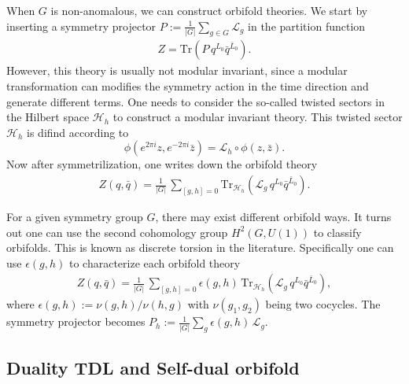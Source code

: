 \documentclass[submission, PhysLectNotes]{SciPost}
\begin{document}
When $G$ is non-anomalous, we can construct orbifold theories. We start by inserting a symmetry projector $P := \frac{1}{|G|} \sum_{g \in G} \mathcal{L}_g$ in the partition function 
\begin{equation}
	\begin{aligned}
		Z = \mathrm{Tr}\left( P\,q^{L_0} \bar{q}^{\bar{L}_0} \right).
	\end{aligned}
\end{equation}
However, this theory is usually not modular invariant, since a modular transformation can modifies the symmetry action in the time direction and generate different terms. One needs to consider the so-called twisted sectors in the Hilbert space $\mathcal{H}_h$ to construct a modular invariant theory. This twisted sector $\mathcal{H}_h$ is difind according to
\begin{equation}
	\phi(e^{2\pi i}z,e^{-2\pi i}\bar{z}) = \mathcal{L}_h \circ \phi(z,\bar{z}).
\end{equation}
Now after symmetrilization, one writes down the orbifold theory
\begin{equation}
	\begin{aligned}
		Z(q,\bar{q}) = \frac{1}{|G|}\,\sum_{[g,h]=0}\mathrm{Tr}_{\mathcal{H}_h}\left( \mathcal{L}_g \, q^{L_0} \bar{q}^{\bar{L}_0} \right).
	\end{aligned}
\end{equation}

For a given symmetry group $G$, there may exist different orbifold ways. It turns out one can use the second cohomology group $H^2(G,U(1))$ to classify orbifolds. This is known as discrete torsion in the literature. Specifically one can use $\epsilon(g,h)$ to characterize each orbifold theory
\begin{equation}
	\begin{aligned}
		Z(q,\bar{q}) = \frac{1}{|G|} \, \sum_{[g,h]=0} \epsilon(g,h) \, \mathrm{Tr}_{\mathcal{H}_h}\left( \mathcal{L}_g \, q^{L_0} \bar{q}^{\bar{L}_0} \right),
	\end{aligned}
\end{equation}
where $\epsilon(g,h) := \nu(g,h)/\nu(h,g)$ with $\nu(g_1,g_2)$ being two cocycles. The symmetry projector becomes $P_h := \frac{1}{|G|}\sum_g \epsilon(g,h)\,\mathcal{L}_g$. 

\subsection{Duality TDL and Self-dual orbifold}
\end{document}
